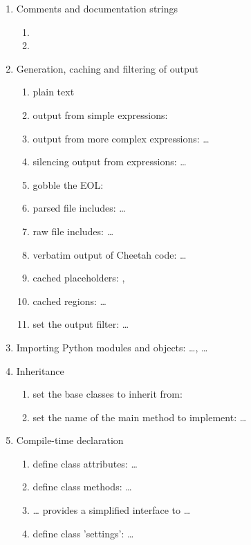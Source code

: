 \begin{enumerate}
\item Comments and documentation strings
     \begin{enumerate}
     \item {}
     \item {}
     \end{enumerate}

\item Generation, caching and filtering of output
     \begin{enumerate}
     \item plain text
     \item output from simple expressions: 
     \item output from more complex expressions:  \ldots
     \item silencing output from expressions:  \ldots
     \item gobble the EOL: 
     \item parsed file includes:  \ldots
     \item raw file includes:  \ldots
     \item verbatim output of Cheetah code:  \ldots {}
     \item cached placeholders: , 
     \item cached regions:  \ldots {}
     \item set the output filter:  \ldots
     \end{enumerate}
          
\item Importing Python modules and objects:  \ldots,
      \ldots

\item Inheritance 
     \begin{enumerate}
     \item set the base classes to inherit from: 
     \item set the name of the main method to implement:  \ldots
     \end{enumerate}

\item Compile-time declaration
     \begin{enumerate}
     \item define class attributes:  \ldots
     \item define class methods:  \ldots {}
     \item {} \ldots {} provides a simplified
          interface to  \ldots {}
     \item define class 'settings':  \ldots {}
     \end{enumerate}


\end{enumerate}
